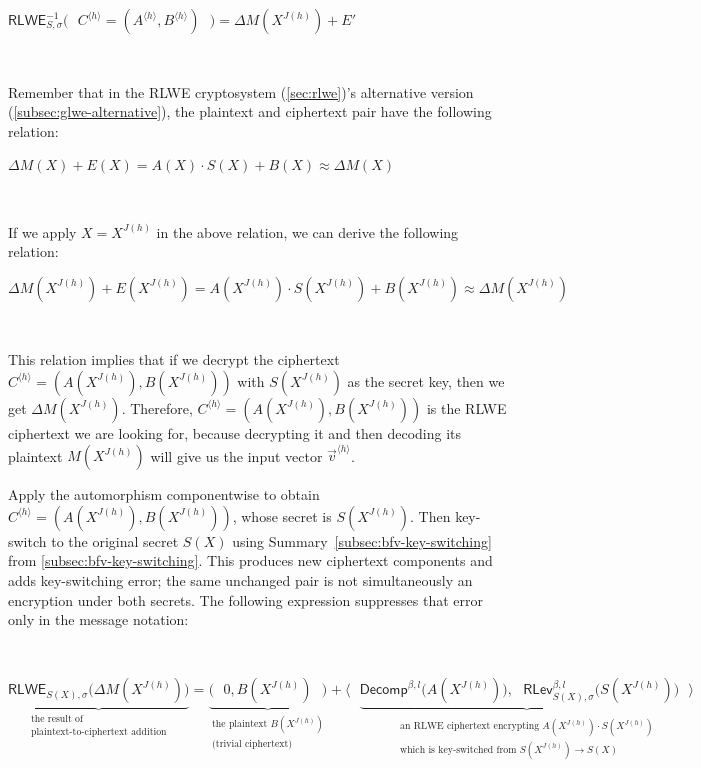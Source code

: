 $\textsf{RLWE}^{-1}_{S, \sigma}\bm{(} \text{ } C^{\langle h \rangle} = (A^{\langle h \rangle}, B^{\langle h \rangle}) \text{ }\bm{)} = \Delta M(X^{J(h)}) + E'$

$ $

Remember that in the RLWE cryptosystem (\autoref{sec:rlwe})'s alternative version (\autoref{subsec:glwe-alternative}), the plaintext and ciphertext pair have the following relation:

$\Delta M(X) + E(X) = A(X)\cdot S(X) + B(X) \approx \Delta M(X)$

$ $

If we apply $X = X^{J(h)}$ in the above relation, we can derive the following relation: 

$\Delta M(X^{J(h)}) + E(X^{J(h)}) = A(X^{J(h)}) \cdot S(X^{J(h)}) + B(X^{J(h)}) \approx \Delta M(X^{J(h)})$

$ $

This relation implies that if we decrypt the ciphertext $C^{\langle h \rangle} = (A(X^{J(h)}), B(X^{J(h)}))$ with $S(X^{J(h)})$ as the secret key, then we get $\Delta M(X^{J(h)})$. Therefore, $C^{\langle h \rangle} = (A(X^{J(h)}), B(X^{J(h)}))$ is the RLWE ciphertext we are looking for, because decrypting it and then decoding its plaintext $M(X^{J(h)})$ will give us the input vector $\vec{v}^{\langle h \rangle}$. 

Apply the automorphism componentwise to obtain $C^{\langle h\rangle}=(A(X^{J(h)}),B(X^{J(h)}))$, whose secret is $S(X^{J(h)})$. Then key-switch to the original secret $S(X)$ using Summary~\ref*{subsec:bfv-key-switching} from \autoref{subsec:bfv-key-switching}. This produces new ciphertext components and adds key-switching error; the same unchanged pair is not simultaneously an encryption under both secrets. The following expression suppresses that error only in the message notation:

$ $

\noindent $\underbrace{\textsf{RLWE}_{S(X),\sigma}\bm{(}\Delta M(X^{J(h)})\bm{)}}_{\substack{\text{the result of} \\ \text{plaintext-to-ciphertext addition}}} = \underbrace{\bm{(} \text{ } 0, B(X^{J(h)}) \text{ } \bm{)}}_{\substack{\text{the plaintext } B(X^{J(h)}) \\ \text{(trivial ciphertext)}}} + \bm{\langle} \text{ } \underbrace{\textsf{Decomp}^{\beta, l}\bm{(}A(X^{J(h)})\bm{)}, \text{ } \textsf{RLev}_{S(X), \sigma}^{\beta, l}\bm{(}S(X^{J(h)})\bm{)} \text{ } \bm{\rangle}}_{\substack{\substack{\text{an RLWE ciphertext encrypting $A(X^{J(h)}) \cdot S(X^{J(h)})$}\\ \text{which is key-switched from $S(X^{J(h)})\rightarrow S(X)$}}}}$



